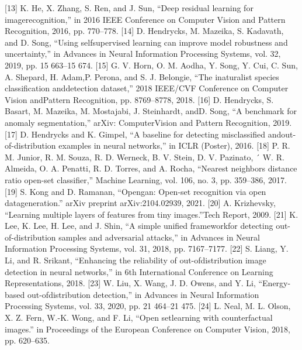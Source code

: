 \documentclass{gji}
\begin{document}
\begin{thebibliography}{}
 [13] K. He, X. Zhang, S. Ren, and J. Sun, “Deep residual learning for imagerecognition,” in 2016 IEEE Conference on Computer Vision and Pattern Recognition, 2016, pp. 770–778.
 [14] D. Hendrycks, M. Mazeika, S. Kadavath, and D. Song, “Using selfsupervised learning can improve model robustness and uncertainty,” in Advances in Neural Information Processing Systems, vol. 32, 2019, pp. 15 663–15 674.
 [15] G. V. Horn, O. M. Aodha, Y. Song, Y. Cui, C. Sun, A. Shepard, H. Adam,P. Perona, and S. J. Belongie, “The inaturalist species classification anddetection dataset,” 2018 IEEE/CVF Conference on Computer Vision andPattern Recognition, pp. 8769–8778, 2018. 
 [16] D. Hendrycks, S. Basart, M. Mazeika, M. Mostajabi, J. Steinhardt, andD. Song, “A benchmark for anomaly segmentation,” arXiv: ComputerVision and Pattern Recognition, 2019.
 [17] D. Hendrycks and K. Gimpel, “A baseline for detecting misclassified andout-of-distribution examples in neural networks,” in ICLR (Poster), 2016.
 [18] P. R. M. Junior, R. M. Souza, R. D. Werneck, B. V. Stein, D. V. Pazinato, ´ W. R. Almeida, O. A. Penatti, R. D. Torres, and A. Rocha, “Nearest neighbors distance ratio open-set classifier,” Machine Learning, vol. 106, no. 3, pp. 359–386, 2017.
 [19] S. Kong and D. Ramanan, “Opengan: Open-set recognition via open datageneration.” arXiv preprint arXiv:2104.02939, 2021.
 [20] A. Krizhevsky, “Learning multiple layers of features from tiny images.”Tech Report, 2009.
 [21] K. Lee, K. Lee, H. Lee, and J. Shin, “A simple unified frameworkfor detecting out-of-distribution samples and adversarial attacks,” in Advances in Neural Information Processing Systems, vol. 31, 2018, pp. 7167–7177.
 [22] S. Liang, Y. Li, and R. Srikant, “Enhancing the reliability of out-ofdistribution image detection in neural networks,” in 6th International Conference on Learning Representations, 2018.
 [23] W. Liu, X. Wang, J. D. Owens, and Y. Li, “Energy-based out-ofdistribution detection,” in Advances in Neural Information Processing Systems, vol. 33, 2020, pp. 21 464–21 475.
 [24] L. Neal, M. L. Olson, X. Z. Fern, W.-K. Wong, and F. Li, “Open setlearning with counterfactual images.” in Proceedings of the European Conference on Computer Vision, 2018, pp. 620–635.

\end{thebibliography}
\end{document}
